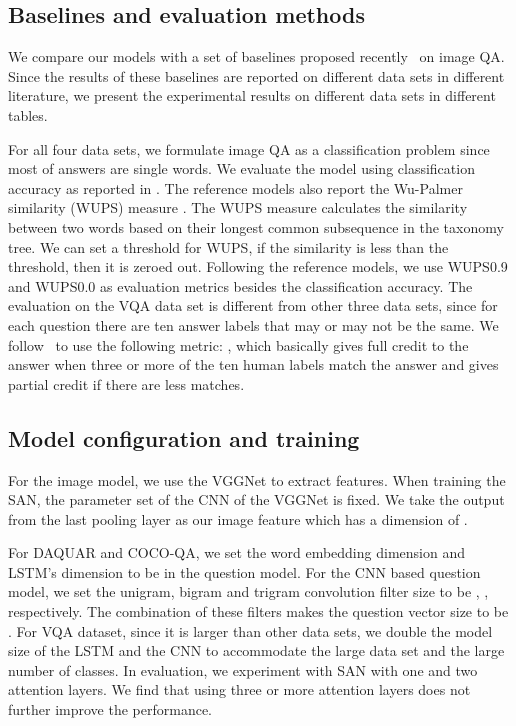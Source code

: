 \documentclass[10pt,twocolumn,letterpaper]{article}
\begin{document}
\subsection{Baselines and evaluation methods}
We compare our models with a set of baselines proposed
recently~\cite{ren2015imageqa, antol2015vqa, malinowski2014multi,
  malinowski2015ask, ma2015learning} on image QA. Since the results of these
baselines are reported on different data sets in different literature, we
present the experimental results on different data sets in different tables.

For all four data sets, we formulate image QA as a classification problem since
most of answers are single words. We evaluate the model using classification
accuracy as reported in \cite{antol2015vqa, ren2015imageqa,
  malinowski2015ask}. The reference models also report the Wu-Palmer similarity
(WUPS) measure \cite{wu1994verbs}. The WUPS measure calculates the similarity
between two words based on their longest common subsequence in the taxonomy
tree. We can set a \mbox{threshold} for WUPS, if the similarity is less than
the threshold, then it is zeroed out. Following the reference models, we use
WUPS0.9 and WUPS0.0 as evaluation metrics besides the classification
accuracy. The evaluation on the VQA data set is different from other three data
sets, since for each question there are ten answer labels that may or may not
be the same. We follow~\cite{antol2015vqa} to use the following metric:
, which basically
gives full credit to the answer when three or more of the ten human labels
match the answer and gives partial credit if there are less matches.

\subsection{Model configuration and training}
For the image model, we use the VGGNet to extract features. When training the
SAN, the parameter set of the CNN of the VGGNet is fixed. We take the output
from the last pooling layer as our image feature which has a dimension of
 .

For DAQUAR and COCO-QA, we set the word embedding dimension and LSTM's
dimension to be  in the question model. For the CNN based question model,
we set the unigram, bigram and trigram convolution filter size to be ,
,  respectively. The combination of these filters makes the question
vector size to be . For VQA dataset, since it is larger than other data
sets, we double the model size of the LSTM and the CNN to accommodate the large
data set and the large number of classes. In evaluation, we experiment with SAN
with one and two attention layers. We find that using three or more attention
layers does not further improve the performance.
\end{document}
